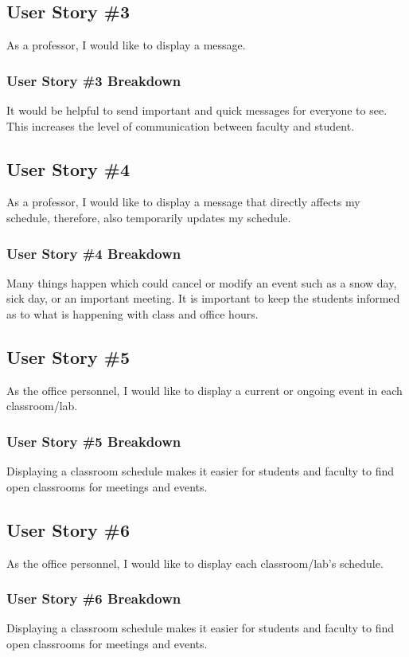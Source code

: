 \subsection{User Story \#3} 
As a professor, I would like to display a message.  
\subsubsection{User Story \#3 Breakdown}
It would be helpful to send important and quick messages for everyone to see. This increases the level of communication between faculty and student.

\subsection{User Story \#4} 
As a professor, I would like to display a message that directly affects my schedule, therefore, also temporarily updates my schedule. 
\subsubsection{User Story \#4 Breakdown}
Many things happen which could cancel or modify an event such as a snow day, sick day, or an important meeting.  It is important to keep the students informed as to what is happening with class and office hours.

\subsection{User Story \#5} 
As the office personnel, I would like to display a current or ongoing event in each classroom/lab. 
\subsubsection{User Story \#5 Breakdown}
Displaying a classroom schedule makes it easier for students and faculty to find open classrooms for meetings and events.

\subsection{User Story \#6} 
As the office personnel, I would like to display each classroom/lab's schedule. 
\subsubsection{User Story \#6 Breakdown}
Displaying a classroom schedule makes it easier for students and faculty to find open classrooms for meetings and events.

